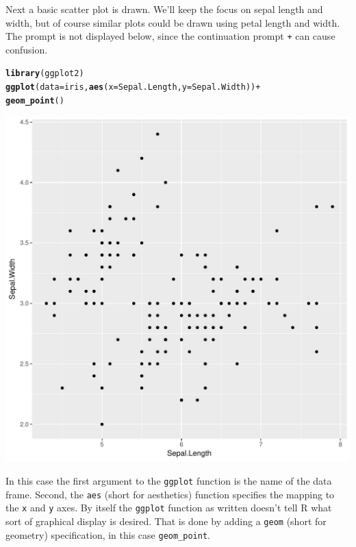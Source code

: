 \documentclass[12pt,oneside]{book}\usepackage[]{graphicx}\usepackage[]{color}
\makeatletter
\def\maxwidth{ %
  \ifdim\Gin@nat@width>\linewidth
    \linewidth
  \else
    \Gin@nat@width
  \fi
}
\newcommand{\hlopt}[1]{\textcolor[rgb]{0,0,0}{#1}}%
\newcommand{\hlstd}[1]{\textcolor[rgb]{0.345,0.345,0.345}{#1}}%
\newcommand{\hlkwc}[1]{\textcolor[rgb]{0.333,0.667,0.333}{#1}}%
\newcommand{\hlkwd}[1]{\textcolor[rgb]{0.737,0.353,0.396}{\textbf{#1}}}%
\newenvironment{kframe}{%
 \def\at@end@of@kframe{}%
 \ifinner\ifhmode%
  \def\at@end@of@kframe{\end{minipage}}%
  \begin{minipage}{\columnwidth}%
 \fi\fi%
 \def\FrameCommand##1{\hskip\@totalleftmargin \hskip-\fboxsep
 \colorbox{shadecolor}{##1}\hskip-\fboxsep
     \hskip-\linewidth \hskip-\@totalleftmargin \hskip\columnwidth}%
 \MakeFramed {\advance\hsize-\width
   \@totalleftmargin\z@ \linewidth\hsize
   \@setminipage}}%
 {\par\unskip\endMakeFramed%
 \at@end@of@kframe}
\newenvironment{knitrout}{}{} %
\makeatother
\begin{document}
Next a basic scatter plot is drawn. We'll keep the focus on sepal length and width, but of course similar plots could be drawn using petal length and width. The prompt is not displayed below, since the continuation prompt \verb|+| can cause confusion.
\begin{knitrout}
\color{fgcolor}\begin{kframe}
\begin{alltt}
\hlkwd{library}\hlstd{(ggplot2)}
\hlkwd{ggplot}\hlstd{(}\hlkwc{data} \hlstd{= iris,} \hlkwd{aes}\hlstd{(}\hlkwc{x} \hlstd{= Sepal.Length,} \hlkwc{y} \hlstd{= Sepal.Width))} \hlopt{+}
    \hlkwd{geom_point}\hlstd{()}
\end{alltt}
\end{kframe}
\includegraphics[width=\maxwidth]{figure/unnamed-chunk-61-1} 

\end{knitrout}
In this case the first argument to the \verb+ggplot+ function is the name of the data frame. Second, the \verb+aes+ (short for aesthetics) function specifies the mapping to the \verb+x+ and \verb+y+ axes. By itself the \verb+ggplot+ function as written doesn't tell R what sort of graphical display is desired. That is done by adding a \verb+geom+ (short for geometry) specification, in this case \verb+geom_point+. 
\end{document}
